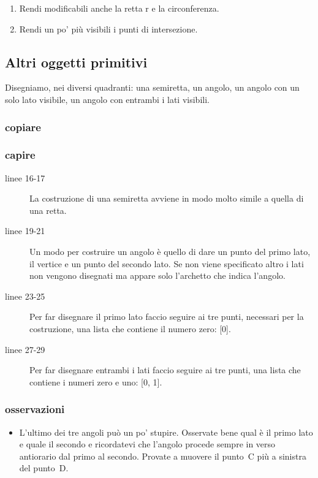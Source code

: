 \begin{enumerate} [noitemsep]
 \item Rendi modificabili anche la retta r e la circonferenza.
 \item Rendi un po' più visibili i punti di intersezione.
\end{enumerate}

\subsection{Altri oggetti primitivi}
\label{subsec:geo_int_altrioggetti}

Disegniamo, nei diversi quadranti: una semiretta, un angolo, un angolo con un 
solo lato visibile, un angolo con entrambi i lati visibili.

\subsubsection{copiare}



\subsubsection{capire}

\begin{description}
 \item [linee 16-17]
La costruzione di una semiretta avviene in modo molto simile a quella di una 
retta.
 \item [linee 19-21]
Un modo per costruire un angolo è quello di dare un punto del primo lato, il 
vertice e un punto del secondo lato. Se non viene specificato altro i lati 
non vengono disegnati ma appare solo l'archetto che indica l'angolo.
 \item [linee 23-25]
Per far disegnare il primo lato faccio seguire ai tre punti, necessari per la 
costruzione, una lista che contiene il numero zero: [0].
 \item [linee 27-29]
Per far disegnare entrambi i lati faccio seguire ai tre punti, una lista che 
contiene i numeri zero e uno: [0, 1].
\end{description}

\subsubsection{osservazioni}

\begin{itemize}
 \item L'ultimo dei tre angoli può un po' stupire. Osservate bene qual è 
il primo lato 
e quale il secondo e ricordatevi che l'angolo procede sempre in verso 
antiorario dal primo al secondo. Provate a muovere il punto~C più a sinistra 
del punto~D.
\end{itemize}

